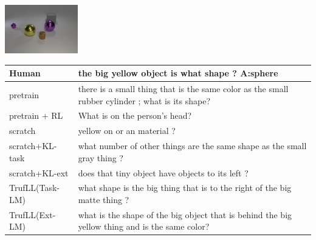 \documentclass{article}
\newcommand{\algo}{TrufLL\xspace}
\begin{document}
\begin{table}[h!]
  \begin{minipage}{0.2\linewidth}
        \includegraphics[width=120px]{./CLEVR_val_004950.png}
	\end{minipage}
           \hspace{1.2cm}
 \begin{minipage}{0.8\linewidth}
		\scriptsize
		\begin{tabular}{ll}
			Human           & the big yellow object is what shape ?  \quad \textbf{A:sphere} \\
			\midrule
			pretrain        & there is a small thing that is the same color as the small rubber cylinder ; what is its shape? \\
		    pretrain + RL   & What is on the person's head? \\ \midrule
			scratch         & yellow on or an material ?  \\
			scratch+KL-task & what number of other things are the same shape as the small gray thing ? \\
			scratch+KL-ext  & does that tiny object have objects to its left ?\\ \midrule
			\algo(Task-LM) & what shape is the big thing that is to the right of the big matte thing ? \\
			\algo(Ext-LM)   & what is the shape of the big object that is behind the big yellow thing and is the same color? \\
			\bottomrule
		\end{tabular}
	\end{minipage}
	\vspace{1mm}
	


\end{table}
\end{document}
